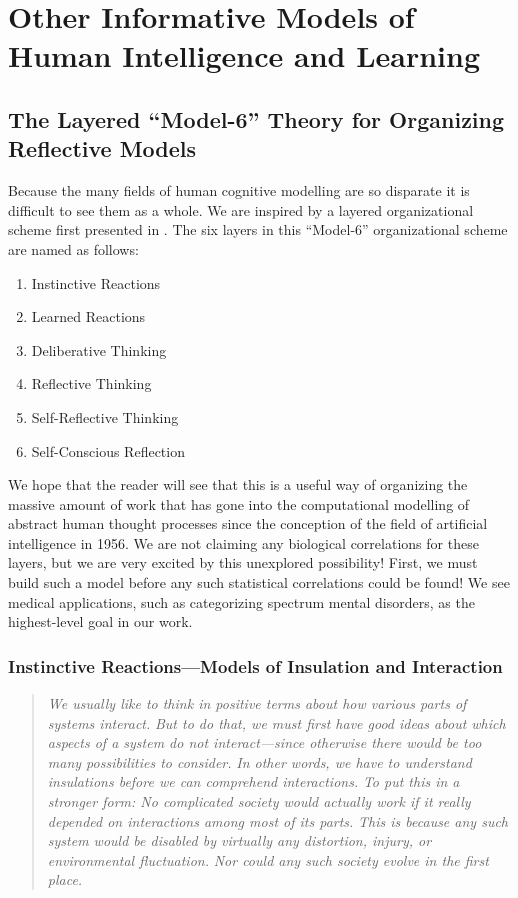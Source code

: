 \chapter{Other Informative Models of Human Intelligence and Learning}
\label{other_models-chapter}

\section{The Layered ``Model-6'' Theory for Organizing Reflective Models}

Because the many fields of human cognitive modelling are so disparate
it is difficult to see them as a whole.  We are inspired by a layered
organizational scheme first presented in \cite{minsky:2006}.  The
six layers in this ``Model-6'' organizational scheme are named as
follows:

\begin{enumerate}
\item{Instinctive Reactions}
\item{Learned Reactions}
\item{Deliberative Thinking}
\item{Reflective Thinking}
\item{Self-Reflective Thinking}
\item{Self-Conscious Reflection}
\end{enumerate}

We hope that the reader will see that this is a useful way of organizing the massive amount of work that has gone into the computational modelling of abstract human thought processes since the conception of the field of artificial intelligence in 1956.
We are not claiming any biological correlations for these layers, but we are very excited by this unexplored possibility!
First, we must build such a model before any such statistical correlations could be found!
We see medical applications, such as categorizing spectrum mental disorders, as the highest-level goal in our work.

\subsection{Instinctive Reactions---Models of Insulation and Interaction}

\begin{quotation}
  \emph{We usually like to think in positive terms about how various parts of systems interact.}
  \emph{But to do that, we must first have good ideas about which aspects of a system do \emph{not} interact---since otherwise there would be too many possibilities to consider.}
  \emph{In other words, we have to understand \emph{insulations} before we can comprehend interactions.}
  \emph{To put this in a stronger form: \emph{No complicated society would actually work if it really depended on interactions among most of its parts}.}
  \emph{This is because any such system would be disabled by virtually any distortion, injury, or environmental fluctuation.}
  \emph{Nor could any such society evolve in the first place.}
\end{quotation}  

